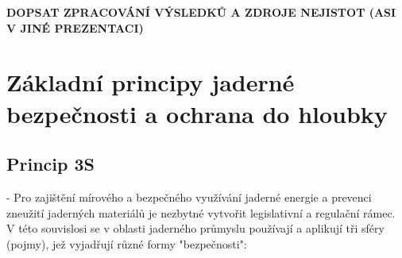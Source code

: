 \textbf{DOPSAT ZPRACOVÁNÍ VÝSLEDKŮ A ZDROJE NEJISTOT (ASI V JINÉ PREZENTACI)}






\newpage
\section{Základní principy jaderné bezpečnosti a ochrana do hloubky}

\subsection{Princip 3S}
- Pro zajištění mírového a bezpečného využívání jaderné energie a prevenci zneužití jaderných materiálů je nezbytné vytvořit legislativní a regulační rámec. V této souvislosi se v oblasti jaderného průmyslu používají a aplikují tři sféry (pojmy), jež vyjadřují různé formy "bezpečnosti":

